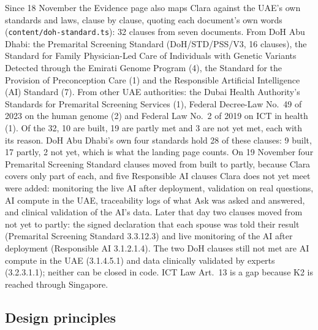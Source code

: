 \documentclass[10.5pt,a4paper]{article}
\newcommand{\file}[1]{\leavevmode\textcolor{muted}{\texttt{\small #1}}}
\begin{document}
Since 18 November the Evidence page also maps Clara against the UAE's own standards and laws, clause by clause, quoting
each document's own words (\file{content/doh-standard.ts}): 32 clauses from seven documents. From DoH Abu Dhabi: the
Premarital Screening Standard (DoH/STD/PSS/V3, 16 clauses), the Standard for Family Physician-Led Care of
Individuals with Genetic Variants Detected through the Emirati Genome Program (4), the Standard for the Provision of
Preconception Care (1) and the Responsible Artificial Intelligence (AI) Standard (7). From other UAE authorities: the
Dubai Health Authority's Standards for Premarital Screening Services (1), Federal Decree-Law No.~49 of 2023 on the human
genome (2) and Federal Law No.~2 of 2019 on ICT in health (1). Of the 32, 10 are built, 19 are partly met and 3 are not
yet met, each with its reason. DoH Abu Dhabi's own four standards hold 28 of these clauses: 9 built, 17 partly, 2 not
yet, which is what the landing page counts. On 19 November four Premarital Screening Standard clauses moved from built
to partly, because Clara covers only part of each, and five Responsible AI clauses Clara does not yet meet were added:
monitoring the live AI after deployment, validation on real questions, AI compute in the UAE, traceability logs of
what Ask was asked and answered, and clinical validation of the AI's data. Later that day two clauses moved from not yet
to partly: the signed declaration that each spouse was told their result (Premarital Screening Standard 3.3.12.3) and
live monitoring of the AI after deployment (Responsible AI 3.1.2.1.4). The two DoH clauses still not met are AI compute
in the UAE (3.1.4.5.1) and data clinically validated by experts (3.2.3.1.1); neither can be closed in code. ICT Law
Art.~13 is a gap because K2 is reached through Singapore.

\subsection{Design principles}
\end{document}
